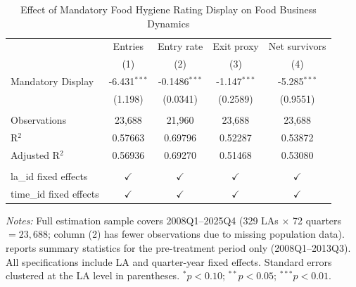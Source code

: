 
\begin{table}[htbp]
   \caption{\label{tab:main} Effect of Mandatory Food Hygiene Rating Display on Food Business Dynamics}
   \bigskip
   \centering
   \small
   \begin{tabular}{lcccc}
      \toprule
       & Entries & Entry rate & Exit proxy & Net survivors\\
                              & (1)            & (2)             & (3)            & (4)\\
      \midrule
      Mandatory Display       & -6.431$^{***}$ & -0.1486$^{***}$ & -1.147$^{***}$ & -5.285$^{***}$\\
                              & (1.198)        & (0.0341)        & (0.2589)       & (0.9551)\\
       \\
      Observations            & 23,688         & 21,960          & 23,688         & 23,688\\
      R$^2$                   & 0.57663        & 0.69796         & 0.52287        & 0.53872\\
      Adjusted R$^2$          & 0.56936        & 0.69270         & 0.51468        & 0.53080\\
       \\
      la\_id fixed effects    & $\checkmark$   & $\checkmark$    & $\checkmark$   & $\checkmark$\\
      time\_id fixed effects  & $\checkmark$   & $\checkmark$    & $\checkmark$   & $\checkmark$\\
      \bottomrule
   \end{tabular}

   \par \raggedright
   \textit{Notes:} Full estimation sample covers 2008Q1--2025Q4 (329 LAs $\times$ 72 quarters $= 23{,}688$; column (2) has fewer observations due to missing population data).  reports summary statistics for the pre-treatment period only (2008Q1--2013Q3). All specifications include LA and quarter-year fixed effects. Standard errors clustered at the LA level in parentheses. $^{*}p<0.10$; $^{**}p<0.05$; $^{***}p<0.01$.
\end{table}

